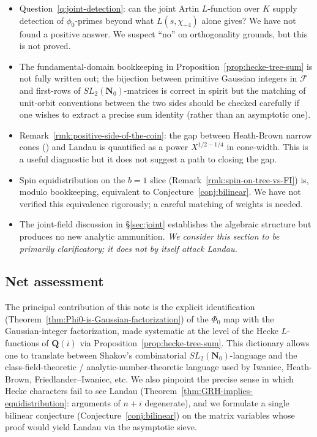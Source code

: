 \documentclass[11pt]{article}
\theoremstyle{definition}
\newcommand{\Nz}{\mathbf{N}_0}
\newcommand{\Q}{\mathbf{Q}}
\newcommand{\SLNz}{SL_2(\Nz)}
\begin{document}
\begin{itemize}
\item Question~\ref{q:joint-detection}: can the joint Artin $L$-function over $K$ supply
detection of $\phi_0$-primes beyond what $L(s,\chi_{-4})$ alone gives? We have not found
a positive answer. We suspect ``no'' on orthogonality grounds, but this is not proved.
\item The fundamental-domain bookkeeping in Proposition~\ref{prop:hecke-tree-sum}
is not fully written out; the bijection between primitive Gaussian integers in
$\mathcal{F}$ and first-rows of $\SLNz$-matrices is correct in spirit but the matching of
unit-orbit conventions between the two sides should be checked carefully if one wishes to
extract a precise sum identity (rather than an asymptotic one).
\item Remark~\ref{rmk:positive-side-of-the-coin}: the gap between Heath-Brown narrow
cones (\cite{HB80}) and Landau is quantified as a power $X^{1/2 - 1/4}$ in cone-width.
This is a useful diagnostic but it does not suggest a path to closing the gap.
\item Spin equidistribution on the $b = 1$ slice (Remark~\ref{rmk:spin-on-tree-vs-FI})
is, modulo bookkeeping, equivalent to Conjecture~\ref{conj:bilinear}. We have not
verified this equivalence rigorously; a careful matching of weights is needed.
\item The joint-field discussion in \S\ref{sec:joint} establishes the algebraic structure
but produces no new analytic ammunition. \emph{We consider this section to be primarily
clarificatory; it does not by itself attack Landau.}
\end{itemize}

\subsection*{Net assessment}

The principal contribution of this note is the explicit identification
(Theorem~\ref{thm:Phi0-is-Gaussian-factorization}) of the $\Phi_0$ map with the
Gaussian-integer factorization, made systematic at the level of the Hecke
$L$-functions of $\Q(i)$ via Proposition~\ref{prop:hecke-tree-sum}. This dictionary
allows one to translate between Shakov's combinatorial $\SLNz$-language and the
class-field-theoretic / analytic-number-theoretic language used by Iwaniec, Heath-Brown,
Friedlander--Iwaniec, etc. We also pinpoint the precise sense in which Hecke characters
fail to see Landau (Theorem~\ref{thm:GRH-implies-equidistribution}: arguments of $n+i$
degenerate), and we formulate a single bilinear conjecture
(Conjecture~\ref{conj:bilinear}) on the matrix variables whose proof would yield Landau
via the asymptotic sieve.
\end{document}
